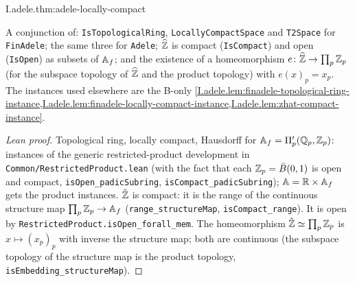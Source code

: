 \begin{theorem}
\end{theorem}
\begin{tfformal}{I.adele.thm:adele-locally-compact}
\begin{tffidelity}
A conjunction of: \texttt{IsTopologicalRing}, \texttt{LocallyCompactSpace} and \texttt{T2Space} for \texttt{FinAdele}; the same three for \texttt{Adele}; $\widehat{\mathbb{Z}}$ is compact (\texttt{IsCompact}) and open (\texttt{IsOpen}) as subsets of $\mathbb{A}_f$; and the existence of a homeomorphism $e\colon\widehat{\mathbb{Z}}\to\prod_p\mathbb{Z}_p$ (for the subspace topology of $\widehat{\mathbb{Z}}$ and the product topology) with $e(x)_p=x_p$. The instances used elsewhere are the B-only \cref{I.adele.lem:finadele-topological-ring-instance,I.adele.lem:finadele-locally-compact-instance,I.adele.lem:zhat-compact-instance}.
\end{tffidelity}
\end{tfformal}
\begin{proof}[Lean proof]
Topological ring, locally compact, Hausdorff for $\mathbb{A}_f=\Pi'_p(\mathbb{Q}_p,\mathbb{Z}_p)$: instances of the generic restricted-product development in \texttt{Common/RestrictedProduct.lean} (with the fact that each $\mathbb{Z}_p=\bar B(0,1)$ is open and compact, \texttt{isOpen\_padicSubring}, \texttt{isCompact\_padicSubring}); $\mathbb{A}=\mathbb{R}\times\mathbb{A}_f$ gets the product instances. $\hat{\mathbb{Z}}$ is compact: it is the range of the continuous structure map $\prod_p\mathbb{Z}_p\to\mathbb{A}_f$ (\texttt{range\_structureMap}, \texttt{isCompact\_range}). It is open by \texttt{RestrictedProduct.isOpen\_forall\_mem}. The homeomorphism $\hat{\mathbb{Z}}\simeq\prod_p\mathbb{Z}_p$ is $x\mapsto(x_p)_p$ with inverse the structure map; both are continuous (the subspace topology of the structure map is the product topology, \texttt{isEmbedding\_structureMap}).
\end{proof}

